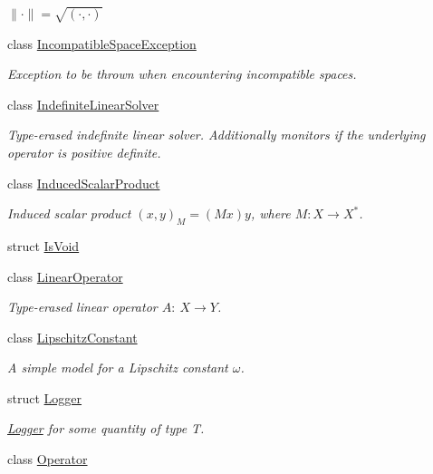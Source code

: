 \begin{DoxyCompactItemize}
\begin{DoxyCompactList}\small\item\em $ \|\cdot\|=\sqrt{(\cdot,\cdot)} $ \end{DoxyCompactList}\item 
class \hyperlink{classSpacy_1_1IncompatibleSpaceException}{Incompatible\+Space\+Exception}
\begin{DoxyCompactList}\small\item\em Exception to be thrown when encountering incompatible spaces. \end{DoxyCompactList}\item 
class \hyperlink{classSpacy_1_1IndefiniteLinearSolver}{Indefinite\+Linear\+Solver}
\begin{DoxyCompactList}\small\item\em Type-\/erased indefinite linear solver. Additionally monitors if the underlying operator is positive definite. \end{DoxyCompactList}\item 
class \hyperlink{classSpacy_1_1InducedScalarProduct}{Induced\+Scalar\+Product}
\begin{DoxyCompactList}\small\item\em Induced scalar product $(x,y)_M = (Mx)y$, where $M:X\rightarrow X^*$. \end{DoxyCompactList}\item 
struct \hyperlink{structSpacy_1_1IsVoid}{Is\+Void}
\item 
class \hyperlink{classSpacy_1_1LinearOperator}{Linear\+Operator}
\begin{DoxyCompactList}\small\item\em Type-\/erased linear operator $A:\ X \to Y $. \end{DoxyCompactList}\item 
class \hyperlink{classSpacy_1_1LipschitzConstant}{Lipschitz\+Constant}
\begin{DoxyCompactList}\small\item\em A simple model for a Lipschitz constant $\omega$. \end{DoxyCompactList}\item 
struct \hyperlink{structSpacy_1_1Logger}{Logger}
\begin{DoxyCompactList}\small\item\em \hyperlink{structSpacy_1_1Logger}{Logger} for some quantity of type T. \end{DoxyCompactList}\item 
class \hyperlink{classSpacy_1_1Operator}{Operator}

\end{DoxyCompactItemize}
